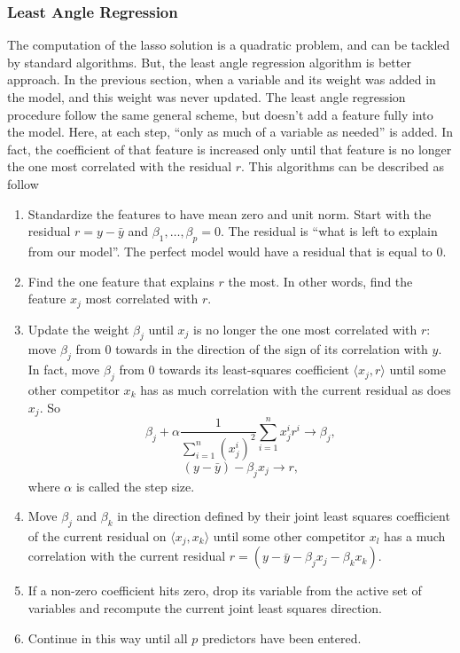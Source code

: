 \documentclass[a4paper,12pt]{article}
\begin{document}
\subsubsection{Least Angle Regression}
The computation of the lasso solution is a quadratic problem, and can be tackled by standard algorithms. But, the least angle regression algorithm is better approach. In the previous section, when a variable and its weight was added in the model, and this weight was never updated. The least angle regression procedure follow the same general scheme, but doesn't add a feature fully into the model. Here, at each step, ``only as much of a variable as needed'' is added. In fact, the coefficient of that feature is increased only until that feature is no longer the one most correlated with the residual $r$. This algorithms can be described as follow
\begin{enumerate}
\item Standardize the features to have mean zero and unit norm. Start with the residual $r = y - \bar{y}$ and $\beta_1, \ldots, \beta_p = 0$. The residual is ``what is left to explain from our model''. The perfect model would have a residual that is equal to $0$.
\item Find the one feature that explains $r$ the most. In other words, find the feature $x_j$ most correlated with $r$.
\item Update the weight $\beta_j$ until $x_j$ is no longer the one most correlated with $r$: move $\beta_j$ from $0$ towards in the direction of the sign of its correlation with $y$. In fact, move $\beta_j$ from $0$ towards its least-squares coefficient $\langle x_j, r \rangle$ until some other competitor $x_k$ has as much correlation with the current residual as does $x_j$. So
\[ \beta_j + \alpha \frac{1}{\sum_{i=1}^n (x_j^i)^2} \sum_{i=1}^n x_j^i r^i \to \beta_j,\]
\[ (y - \bar{y}) - \beta_j x_j \to r,\]
where $\alpha$ is called the step size.
\item Move $\beta_j$ and $\beta_k$ in the direction defined by their joint least squares coefficient of the current residual on $\langle x_j, x_k \rangle$ until some other competitor $x_l$ has a much correlation with the current residual $r = (y-\bar{y} - \beta_j x_j - \beta_k x_k)$.
\item If a non-zero coefficient hits zero, drop its variable from the active set of variables and recompute the current joint least squares direction.
\item Continue in this way until all $p$ predictors have been entered.
\end{enumerate}
\end{document}
